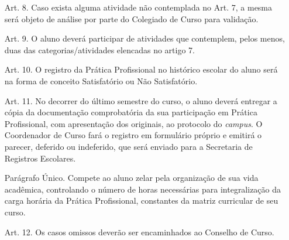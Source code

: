 \documentclass[
	12pt,				%
	openright,			%
	twoside,			%
	a4paper,			%
	chapter=TITLE,		%
	english,			%
	french,				%
	spanish,			%
	brazil,				%
	]{abntex2}
\begin{document}
\begin{anexos}
\begin{itemize}
\begin{itemize}
		\item [Art. 8\textordmasculine.]    Caso exista alguma atividade não contemplada no Art. 7\textordmasculine, a mesma será objeto de análise por parte do Colegiado de Curso para validação.
		
		\item [Art. 9\textordmasculine.]    O aluno deverá participar de atividades que contemplem, pelos menos, duas das categorias/atividades elencadas no artigo 7\textordmasculine.
		
		\item [Art. 10\textordmasculine.]    O registro da Prática Profissional no histórico escolar do aluno será na forma de conceito Satisfatório ou Não Satisfatório.
		
		\item [Art. 11\textordmasculine.]    No decorrer do último semestre do curso, o aluno deverá entregar a cópia da documentação comprobatória da sua participação em Prática Profissional, com apresentação dos originais, ao protocolo do \textit{campus}. O Coordenador de Curso fará o registro em formulário próprio e emitirá o parecer, deferido ou indeferido, que será enviado para a Secretaria de Registros Escolares.
		
		Parágrafo Único. Compete ao aluno zelar pela organização de sua vida acadêmica, controlando o número de horas necessárias para integralização da carga horária da Prática Profissional, constantes da matriz curricular de seu curso.

		\item [Art. 12\textordmasculine.]    Os casos omissos deverão ser encaminhados ao Conselho de Curso.
	
	\end{itemize}

	
\end{itemize}


\end{anexos}
\end{document}
